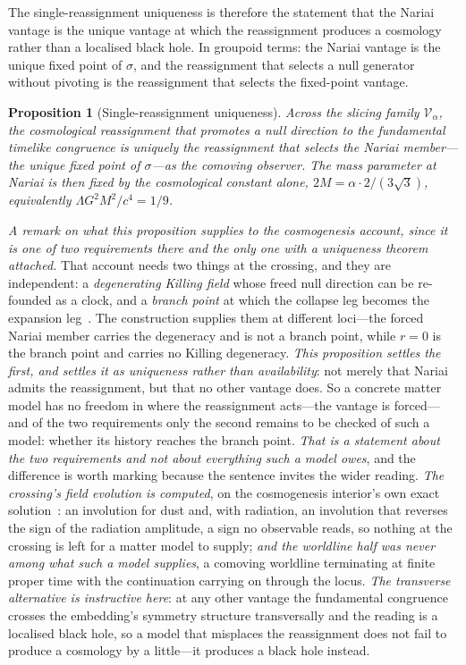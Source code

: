 \documentclass[11pt,a4paper]{article}
\newtheorem{proposition}[theorem]{Proposition}
\theoremstyle{definition}
\begin{document}
The single-reassignment uniqueness is therefore the statement that the Nariai vantage is the unique vantage at which the reassignment produces a cosmology rather than a localised black hole. In groupoid terms: the Nariai vantage is the unique fixed point of $\sigma$, and the reassignment that selects a null generator without pivoting is the reassignment that selects the fixed-point vantage.

\begin{proposition}[Single-reassignment uniqueness]\label{prop:single}
Across the slicing family $\mathcal{V}_{\alpha}$, the cosmological reassignment that promotes a null direction to the fundamental timelike congruence is uniquely the reassignment that selects the Nariai member---the unique fixed point of $\sigma$---as the comoving observer. The mass parameter at Nariai is then fixed by the cosmological constant alone, $2M=\alpha\cdot 2/(3\sqrt{3})$, equivalently $\Lambda G^{2}M^{2}/c^{4}=1/9$.
\end{proposition}

\noindent\emph{A remark on what this proposition supplies to the cosmogenesis account, since it is one of two
requirements there and the only one with a uniqueness theorem attached.} That account needs two things at the
crossing, and they are independent: a \emph{degenerating Killing field} whose freed null direction can be
re-founded as a clock, and a \emph{branch point} at which the collapse leg becomes the expansion
leg~\cite{JanzenDynamics, JanzenCRframework}. The construction supplies them at different loci---the forced
Nariai member carries the degeneracy and is not a branch point, while $r=0$ is the branch point and carries no
Killing degeneracy. \emph{This proposition settles the first, and settles it as uniqueness rather than
availability}: not merely that Nariai admits the reassignment, but that no other vantage does. So a concrete
matter model has no freedom in where the reassignment acts---the vantage is forced---and of the two
requirements only the second remains to be checked of such a model: whether its history reaches the branch
point. \emph{That is a statement about the two requirements and not about everything such a model owes}, and
the difference is worth marking because the sentence invites the wider reading. \emph{The crossing's
\emph{field} evolution is computed}, on the cosmogenesis interior's own exact solution~\cite{JanzenCosmogenesis}:
an involution for dust and, with radiation, an involution that reverses the sign of the radiation amplitude, a
sign no observable reads, so nothing at the crossing is left for a matter model to supply; \emph{and the worldline
half was never among what such a model supplies}, a comoving worldline terminating at finite proper time with the
continuation carrying on through the locus. \emph{The transverse alternative
is instructive here}: at any other vantage the fundamental congruence crosses the embedding's symmetry
structure transversally and the reading is a localised black hole, so a model that misplaces the reassignment
does not fail to produce a cosmology by a little---it produces a black hole instead.
\end{document}
